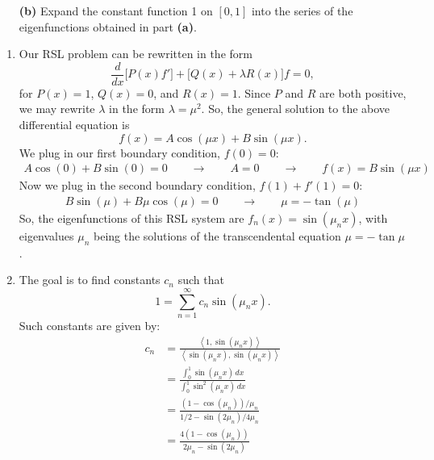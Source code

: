 \documentclass[10pt,letterpaper]{report}
\newcommand{\ip}[2]{\left\langle{#1},{#2}\right\rangle}
\begin{document}
\begin{enumerate}
\begin{qbox}
\begin{itemize}
    [Hint: Those eigenvalues are the solutions of some transcendental (also known as \textit{secular}) equation.]
    
    \item[\textbf{(b)}] Expand the constant function 1 on $[0, 1]$ into the series of the eigenfunctions obtained in part \textbf{(a)}.
\end{itemize}
\end{qbox}

\begin{enumerate}
    \item Our RSL problem can be rewritten in the form
    \[
    \frac{d}{dx}\big[P(x) f'\big] + \big[Q(x) + \lambda R(x) \big]f = 0,
    \]
    for $P(x) = 1$, $Q(x) = 0$, and $R(x) = 1$. Since $P$ and $R$ are both positive, we may rewrite $\lambda$ in the form $\lambda = \mu^2$. So, the general solution to the above differential equation is 
    \[
    f(x) = A\cos(\mu x) + B\sin(\mu x).
    \]
    We plug in our first boundary condition, $f(0) = 0$:
    \begin{align*}
        A \cos(0) + B\sin(0) = 0
        \qquad \rightarrow \qquad
        A = 0 \qquad \rightarrow \qquad f(x) = B\sin(\mu x)
    \end{align*}
    Now we plug in the second boundary condition, $f(1) + f'(1) = 0$:
    \begin{align*}
        B\sin(\mu) + B\mu \cos(\mu) = 0
        \qquad \rightarrow \qquad
        \mu = - \tan(\mu)
    \end{align*}
    So, the eigenfunctions of this RSL system are $f_n(x) = \sin(\mu_n x)$, with eigenvalues $\mu_n$ being the solutions of the transcendental equation $\mu = -\tan\mu$.
    
    \item The goal is to find constants $c_n$ such that
    \[
    1 = \sum_{n=1}^\infty c_n\sin(\mu_n x).
    \]
    Such constants are given by:
    \begin{align*}
    c_n &= \frac{\ip{1}{\sin(\mu_n x)}}{\ip{\sin(\mu_n x)}{\sin(\mu_n x)}} \\
    &= 
    \frac{\int_0^1 \sin(\mu_n x)\,dx}{\int_0^1 \sin^2(\mu_n x)\,dx}
    \\
    &=
    \frac{(1 - \cos(\mu_n))/\mu_n}{1/2 - \sin(2\mu_n)/4\mu_n}
    \\
    &=
    \frac{4(1 - \cos(\mu_n))}{2\mu_n - \sin(2\mu_n)}
    \end{align*}
\end{enumerate}


\end{enumerate}
\end{document}
